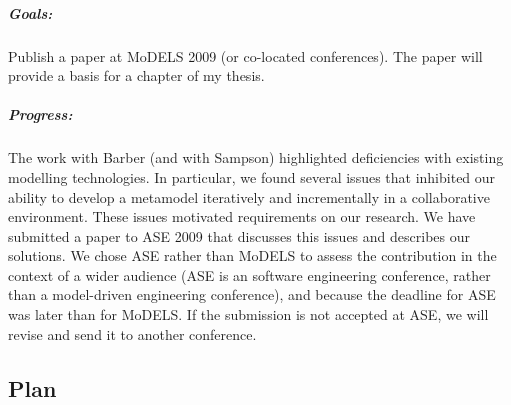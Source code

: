 \subparagraph{Goals:} Publish a paper at MoDELS 2009 (or co-located conferences). The paper will provide a basis for a chapter of my thesis.

\subparagraph{Progress:} The work with Barber (and with Sampson) highlighted deficiencies with existing modelling technologies. In particular, we found several issues that inhibited our ability to develop a metamodel iteratively and incrementally in a collaborative environment. These issues motivated requirements on our research. We have submitted a paper to ASE 2009 that discusses this issues and describes our solutions. We chose ASE rather than MoDELS to assess the contribution in the context of a wider audience (ASE is an software engineering conference, rather than a model-driven engineering conference), and because the deadline for ASE was later than for MoDELS. If the submission is not accepted at ASE, we will revise and send it to another conference.


\subsection{Plan}
